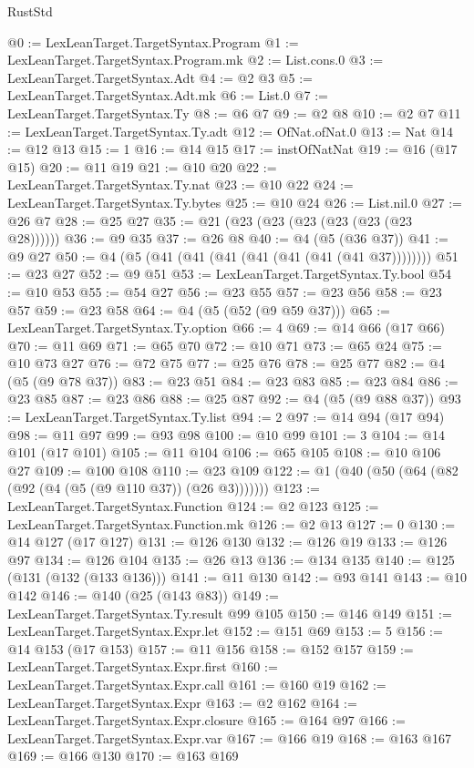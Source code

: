 \begin{lexlean}{RustStd}
\begin{coremodule}
@0 := LexLeanTarget.TargetSyntax.Program
@1 := LexLeanTarget.TargetSyntax.Program.mk
@2 := List.cons.{0}
@3 := LexLeanTarget.TargetSyntax.Adt
@4 := @2 @3
@5 := LexLeanTarget.TargetSyntax.Adt.mk
@6 := List.{0}
@7 := LexLeanTarget.TargetSyntax.Ty
@8 := @6 @7
@9 := @2 @8
@10 := @2 @7
@11 := LexLeanTarget.TargetSyntax.Ty.adt
@12 := OfNat.ofNat.{0}
@13 := Nat
@14 := @12 @13
@15 := 1
@16 := @14 @15
@17 := instOfNatNat
@19 := @16 (@17 @15)
@20 := @11 @19
@21 := @10 @20
@22 := LexLeanTarget.TargetSyntax.Ty.nat
@23 := @10 @22
@24 := LexLeanTarget.TargetSyntax.Ty.bytes
@25 := @10 @24
@26 := List.nil.{0}
@27 := @26 @7
@28 := @25 @27
@35 := @21 (@23 (@23 (@23 (@23 (@23 (@23 @28))))))
@36 := @9 @35
@37 := @26 @8
@40 := @4 (@5 (@36 @37))
@41 := @9 @27
@50 := @4 (@5 (@41 (@41 (@41 (@41 (@41 (@41 (@41 @37))))))))
@51 := @23 @27
@52 := @9 @51
@53 := LexLeanTarget.TargetSyntax.Ty.bool
@54 := @10 @53
@55 := @54 @27
@56 := @23 @55
@57 := @23 @56
@58 := @23 @57
@59 := @23 @58
@64 := @4 (@5 (@52 (@9 @59 @37)))
@65 := LexLeanTarget.TargetSyntax.Ty.option
@66 := 4
@69 := @14 @66 (@17 @66)
@70 := @11 @69
@71 := @65 @70
@72 := @10 @71
@73 := @65 @24
@75 := @10 @73 @27
@76 := @72 @75
@77 := @25 @76
@78 := @25 @77
@82 := @4 (@5 (@9 @78 @37))
@83 := @23 @51
@84 := @23 @83
@85 := @23 @84
@86 := @23 @85
@87 := @23 @86
@88 := @25 @87
@92 := @4 (@5 (@9 @88 @37))
@93 := LexLeanTarget.TargetSyntax.Ty.list
@94 := 2
@97 := @14 @94 (@17 @94)
@98 := @11 @97
@99 := @93 @98
@100 := @10 @99
@101 := 3
@104 := @14 @101 (@17 @101)
@105 := @11 @104
@106 := @65 @105
@108 := @10 @106 @27
@109 := @100 @108
@110 := @23 @109
@122 := @1 (@40 (@50 (@64 (@82 (@92 (@4 (@5 (@9 @110 @37)) (@26 @3)))))))
@123 := LexLeanTarget.TargetSyntax.Function
@124 := @2 @123
@125 := LexLeanTarget.TargetSyntax.Function.mk
@126 := @2 @13
@127 := 0
@130 := @14 @127 (@17 @127)
@131 := @126 @130
@132 := @126 @19
@133 := @126 @97
@134 := @126 @104
@135 := @26 @13
@136 := @134 @135
@140 := @125 (@131 (@132 (@133 @136)))
@141 := @11 @130
@142 := @93 @141
@143 := @10 @142
@146 := @140 (@25 (@143 @83))
@149 := LexLeanTarget.TargetSyntax.Ty.result @99 @105
@150 := @146 @149
@151 := LexLeanTarget.TargetSyntax.Expr.let
@152 := @151 @69
@153 := 5
@156 := @14 @153 (@17 @153)
@157 := @11 @156
@158 := @152 @157
@159 := LexLeanTarget.TargetSyntax.Expr.first
@160 := LexLeanTarget.TargetSyntax.Expr.call
@161 := @160 @19
@162 := LexLeanTarget.TargetSyntax.Expr
@163 := @2 @162
@164 := LexLeanTarget.TargetSyntax.Expr.closure
@165 := @164 @97
@166 := LexLeanTarget.TargetSyntax.Expr.var
@167 := @166 @19
@168 := @163 @167
@169 := @166 @130
@170 := @163 @169

\end{coremodule}
\end{lexlean}
